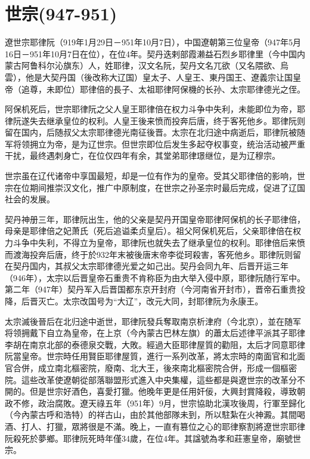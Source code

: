 
\section{世宗\tiny(947-951)}

遼世宗耶律阮（919年1月29日－951年10月7日），中国遼朝第三位皇帝（947年5月16日－951年10月7日在位），在位4年。契丹迭剌部霞濑益石烈乡耶律里（今中国内蒙古阿鲁科尔沁旗东）人，姓耶律，汉文名阮，契丹文名兀欲（又名隈欲、烏雲），他是大契丹国（後改称大辽国）皇太子、人皇王、東丹国王、遼義宗让国皇帝（追尊，未即位）耶律倍的長子、太祖耶律阿保機的长孙、太宗耶律德光之侄。

阿保机死后，世宗耶律阮之父人皇王耶律倍在权力斗争中失利，未能即位为帝，耶律阮遂失去继承皇位的权利。人皇王後来愤而投奔后唐，终于客死他乡。耶律阮则留在国内，后随叔父太宗耶律德光南征後晋。太宗在北归途中病逝后，耶律阮被随军将领拥立为帝，是为辽世宗。但世宗即位后发生多起夺权事变，统治活动被严重干扰，最终遇刺身亡，在位仅四年有余，其堂弟耶律璟继位，是为辽穆宗。

世宗虽在辽代诸帝中享国最短，却是一位有作为的皇帝。受其父耶律倍的影响，世宗在位期间推崇汉文化，推广中原制度，在世宗之孙圣宗时最后完成，促进了辽国社会的发展。

契丹神册三年，耶律阮出生，他的父亲是契丹开国皇帝耶律阿保机的长子耶律倍，母亲是耶律倍之妃萧氏（死后追谥柔贞皇后）。祖父阿保机死后，父亲耶律倍在权力斗争中失利，不得立为皇帝，耶律阮也就失去了继承皇位的权利。耶律倍后来愤而渡海投奔后唐，终于於932年末被後唐末帝李從珂殺害，客死他乡。耶律阮则留在契丹国内，其叔父太宗耶律德光爱之如己出。契丹会同九年、后晋开运三年（946年），太宗以后晋皇帝石重贵不肯称臣为由大举入侵中原，耶律阮随行军中。第二年（947年）契丹军入后晋国都东京开封府（今河南省开封市），晋帝石重贵投降，后晋灭亡。太宗改国号为“大辽”，改元大同，封耶律阮为永康王。

太宗滅後晉后在北归途中逝世，耶律阮發兵奪取南京析津府（今北京），並在随军将领拥戴下自立為皇帝，在上京（今內蒙古巴林左旗）的蕭太后述律平派其子耶律李胡在南京北部的泰德泉交戰，大敗。經過大臣耶律屋質的勸阻，太后才同意耶律阮當皇帝。世宗時任用賢臣耶律屋質，進行一系列改革，將太宗時的南面官和北面官合併，成立南北樞密院，廢南、北大王，後來南北樞密院合併，形成一個樞密院。這些改革使遼朝從部落聯盟形式進入中央集權，這些都是與遼世宗的改革分不開的。但是世宗好酒色，喜愛打獵。他晚年更是任用奸佞，大興封賞降殺，導致朝政不修，政治腐敗。遼天祿五年（951年）9月，世宗協助北漢攻後周，行軍至歸化（今內蒙古呼和浩特）的祥古山，由於其他部隊未到，所以駐紮在火神澱。其間喝酒、打人、打獵，眾將很是不滿。晚上，一直有篡位之心的耶律察割將遼世宗耶律阮殺死於夢鄉。耶律阮死時年僅34歲，在位4年。其諡號為孝和莊憲皇帝，廟號世宗。

